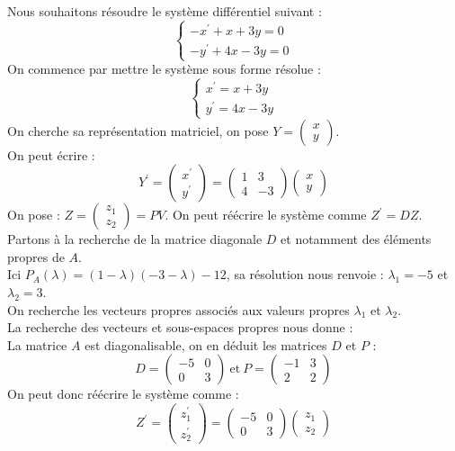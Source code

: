 \begin{ex}
Nous souhaitons résoudre le système différentiel suivant :
$$\begin{cases}
-x^{\prime}+x+3y = 0\\
-y^{\prime}+4x-3y = 0
\end{cases}$$
On commence par mettre le système sous forme résolue :
$$\begin{cases}
x^{\prime}=x+3y\\
y^{\prime}=4x-3y
\end{cases}$$
On cherche sa représentation matriciel, on pose $Y=\begin{pmatrix}x\\y\end{pmatrix}$.\\
On peut écrire :
$$Y^{\prime}=\begin{pmatrix}x^{\prime}\\y^{\prime}\end{pmatrix}=\begin{pmatrix}1&3\\4&-3\end{pmatrix}\begin{pmatrix}x\\y\end{pmatrix}$$
On pose : $Z=\begin{pmatrix}z_1\\z_2\end{pmatrix}=PV$.
On peut réécrire le système comme $Z^{\prime}=DZ$.\\
Partons à la recherche de la matrice diagonale $D$ et notamment des éléments propres de $A$.\\
Ici $P_A(\lambda)=(1-\lambda)(-3-\lambda)-12$, sa résolution nous renvoie : $\lambda_1=-5$ et $\lambda_2=3$.\\
On recherche les vecteurs propres associés aux valeurs propres $\lambda_1$ et $\lambda_2$.\\
La recherche des vecteurs et sous-espaces propres nous donne :\\
La matrice $A$ est diagonalisable, on en déduit les matrices $D$ et $P$ :
$$D=\begin{pmatrix}-5&0\\0&3\end{pmatrix}\ \text{et}\ P=\begin{pmatrix}-1&3\\2&2\end{pmatrix}$$
On peut donc réécrire le système comme :
$$Z^{\prime}=\begin{pmatrix}z_1^{\prime}\\z_2^{\prime}\end{pmatrix}=\begin{pmatrix}-5&0\\0&3\end{pmatrix}\begin{pmatrix}z_1\\z_2\end{pmatrix}$$

\end{ex}

